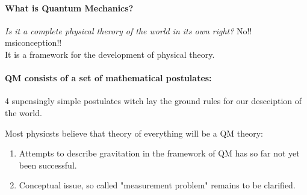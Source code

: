 \documentclass[]{article}
\theoremstyle{nonumberplain}
\begin{document}
\paragraph{\textbf{What is Quantum Mechanics?}}%
\label{par:paragraph_name}
\begin{center}
	\textit{Is it a complete physical therory of the world in its own right? } No!! msiconception!!\\
	It is a framework for the development of physical theory.
\end{center}

\paragraph{\textbf{QM consists of a set of mathematical postulates:\\}}%
\label{par:qm_consists_of_a_set_of_mathematical_postulates_}
\begin{center}
4 supensingly simple postulates witch lay the ground rules for our desceiption of the world.\\
\end{center}
Most physicsts believe that theory of everything will be a QM theory:
\begin{enumerate}
	\item Attempts to describe gravitation in the framework of QM has so far not yet been successful.
	\item Conceptual issue, so called "measurement problem" remains to be clarified.
\end{enumerate}
\end{document}
